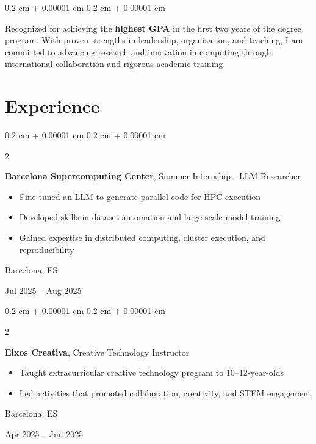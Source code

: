 \documentclass[10pt, letterpaper]{article}
\newenvironment{highlights}{
    \begin{itemize}[
        topsep=0.10 cm,
        parsep=0.10 cm,
        partopsep=0pt,
        itemsep=0pt,
        leftmargin=0.4 cm + 10pt
    ]
}{
    \end{itemize}
} %
\newenvironment{onecolentry}{
    \begin{adjustwidth}{
        0.2 cm + 0.00001 cm
    }{
        0.2 cm + 0.00001 cm
    }
}{
    \end{adjustwidth}
} %
\newenvironment{twocolentry}[2][]{
    \onecolentry
    \def\secondColumn{#2}
    \setcolumnwidth{\fill, 4.5 cm}
    \begin{paracol}{2}
}{
    \switchcolumn \raggedleft \secondColumn
    \end{paracol}
    \endonecolentry
} %
\begin{document}
        \vspace{0.2 cm}

        \begin{onecolentry}
            Recognized for achieving the \textbf{highest GPA} in the first two years of the degree program. With proven strengths in leadership, organization, and teaching, I am committed to advancing research and innovation in computing through international collaboration and rigorous academic training.
        \end{onecolentry}


    \section{Experience}

       \begin{twocolentry}{
            Barcelona, ES

            Jul 2025 – Aug 2025
        }
            \textbf{Barcelona Supercomputing Center}, Summer Internship - LLM Researcher
            \begin{highlights}
                \item Fine-tuned an LLM to generate parallel code for HPC execution
                \item Developed skills in dataset automation and large-scale model training
                \item Gained expertise in distributed computing, cluster execution, and reproducibility
            \end{highlights}
        \end{twocolentry}

        \vspace{0.2 cm}

        \begin{twocolentry}{
            Barcelona, ES

            Apr 2025 – Jun 2025
        }
            \textbf{Eixos Creativa}, Creative Technology Instructor
            \begin{highlights}
                \item Taught extracurricular creative technology program to 10–12-year-olds
                \item Led activities that promoted collaboration, creativity, and STEM engagement
            \end{highlights}
        \end{twocolentry}

        \vspace{0.2 cm}
        
\end{document}
